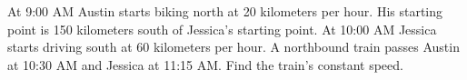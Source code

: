 At 9:00 AM Austin starts biking north at 20 kilometers per hour. His starting point is 150 kilometers south of Jessica's starting point. At 10:00 AM Jessica starts driving south at 60 kilometers per hour. A northbound train passes Austin at 10:30 AM and Jessica at 11:15 AM. Find the train's constant speed.
